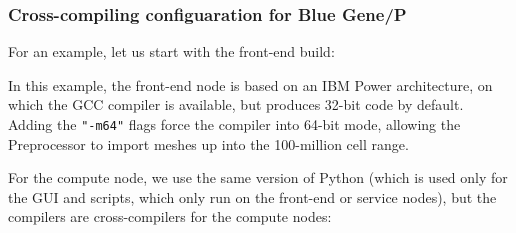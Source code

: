 \documentclass[a4paper,10pt,twoside]{csshortdoc}
\begin{document}
\subsubsection{Cross-compiling configuaration for Blue Gene/P}

For an example, let us start with the front-end build:


In this example, the front-end node is based on an IBM Power architecture,
on which the GCC compiler is available, but produces 32-bit code by default.
Adding the \texttt{"-m64"} flags force the compiler into 64-bit mode, allowing
the Preprocessor to import meshes up into the 100-million cell range.

For the compute node, we use the same version of Python (which
is used only for the GUI and scripts, which only run on the front-end
or service nodes), but the compilers are cross-compilers for the
compute nodes:
\end{document}
